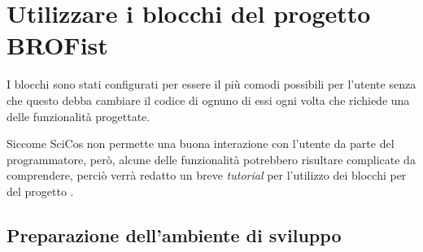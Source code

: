 \chapter{Utilizzare i blocchi del progetto BROFist}
I blocchi sono stati configurati per essere il più comodi possibili per
l'utente senza che questo debba cambiare il codice di ognuno di essi ogni
volta che richiede una delle funzionalità progettate.

Siccome SciCos non permette una buona interazione con l'utente da parte del
programmatore, però, alcune delle funzionalità potrebbero risultare
complicate da comprendere, perciò verrà redatto un breve \emph{tutorial}
per l'utilizzo dei blocchi per \SciCos{} del progetto \BROFist{}.

\section{Preparazione dell'ambiente di sviluppo}


\cleardoublepage
